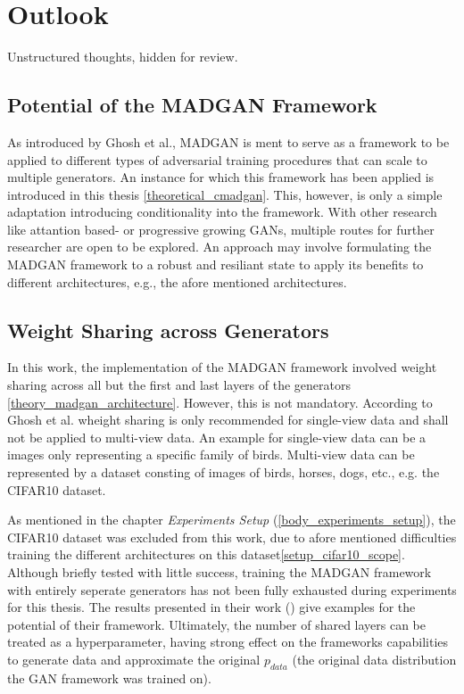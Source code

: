 \section{Outlook}\label{outlook}

Unstructured thoughts, hidden for review. 

\subsection{Potential of the MADGAN Framework}
As introduced by Ghosh et al., MADGAN is ment to serve as a framework to be applied to different types of adversarial training procedures that can scale to multiple generators. An instance for which this framework has been applied is introduced in this thesis \ref{theoretical_cmadgan}. This, however, is only a simple adaptation introducing conditionality into the framework. With other research like attantion based- or progressive growing GANs, multiple routes for further researcher are open to be explored. An approach may involve formulating the MADGAN framework to a robust and resiliant state to apply its benefits to different architectures, e.g., the afore mentioned architectures. 



\subsection{Weight Sharing across Generators}
In this work, the implementation of the MADGAN framework involved weight sharing across all but the first and last layers of the generators \ref{theory_madgan_architecture}. However, this is not mandatory. According to Ghosh et al. wheight sharing is only recommended for single-view data and shall not be applied to multi-view data. An example for single-view data can be a images only representing a specific family of birds. Multi-view data can be represented by a dataset consting of images of birds, horses, dogs, etc., e.g. the CIFAR10 dataset. 

As mentioned in the chapter \textit{Experiments Setup} (\ref{body_experiments_setup}), the CIFAR10 dataset was excluded from this work, due to afore mentioned difficulties training the different architectures on this dataset\ref{setup_cifar10_scope}. Although briefly tested with little success, training the MADGAN framework with entirely seperate generators has not been fully exhausted during experiments for this thesis. The results presented in their work (\cite{ghosh2018madgan}) give examples for the potential of their framework. 
Ultimately, the number of shared layers can be treated as a hyperparameter, having strong effect on the frameworks capabilities to generate data and approximate the original \(p_{data}\) (the original data distribution the GAN framework was trained on).

